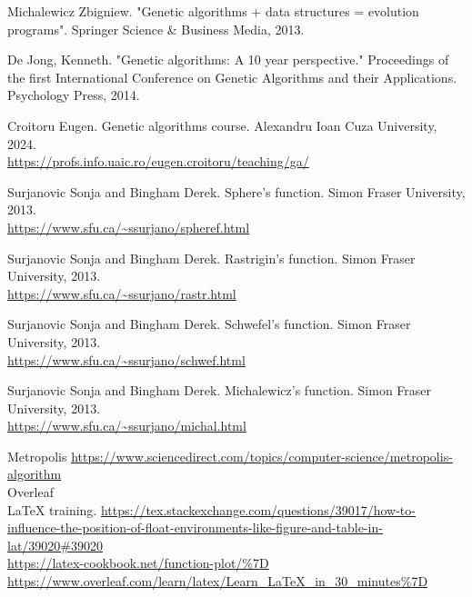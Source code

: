 \documentclass{article}
\begin{document}
\begin{thebibliography}{9}

 Michalewicz Zbigniew. "Genetic algorithms + data structures = evolution programs". Springer Science \& Business Media, 2013.

 De Jong, Kenneth. "Genetic algorithms: A 10 year perspective." Proceedings of the first International Conference on Genetic Algorithms and their Applications. Psychology Press, 2014.

  Croitoru Eugen. Genetic algorithms course. Alexandru Ioan Cuza University, 2024.\\
  \url{https://profs.info.uaic.ro/eugen.croitoru/teaching/ga/}

 Surjanovic Sonja and Bingham Derek. Sphere's function. Simon Fraser University, 2013.\\
  \url{https://www.sfu.ca/~ssurjano/spheref.html}

 Surjanovic Sonja and Bingham Derek. Rastrigin's function. Simon Fraser University, 2013.\\
  \url{https://www.sfu.ca/~ssurjano/rastr.html}

 Surjanovic Sonja and Bingham Derek. Schwefel's function. Simon Fraser University, 2013.\\
  \url{https://www.sfu.ca/~ssurjano/schwef.html}

 Surjanovic Sonja and Bingham Derek. Michalewicz's function. Simon Fraser University, 2013.\\
  \url{https://www.sfu.ca/~ssurjano/michal.html}

    Metropolis \url{https://www.sciencedirect.com/topics/computer-science/metropolis-algorithm} \\  

  Overleaf \\ LaTeX training.
  \url{https://tex.stackexchange.com/questions/39017/how-to-influence-the-position-of-float-environments-like-figure-and-table-in-lat/39020#39020} \\
  \url{https://latex-cookbook.net/function-plot/%7D} \\  
  \url{https://www.overleaf.com/learn/latex/Learn_LaTeX_in_30_minutes%7D}

\end{thebibliography}  
\end{document}
